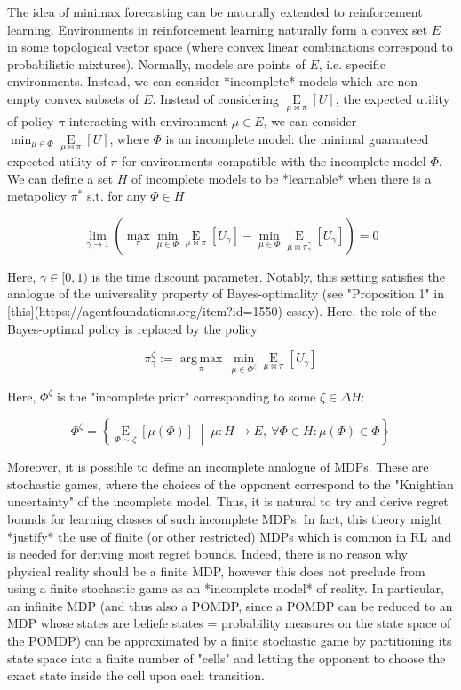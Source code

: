 \documentclass[a4paper]{article}
\newcommand{\AP}[1]{\left(#1\right)}
\newcommand{\AB}[1]{\left[#1\right]}
\newcommand{\ACM}[2]{\left\{#1\;\middle\vert\;#2\right\}}
\newcommand{\Ea}[2]{\underset{#1}{\operatorname{E}}\AB{#2}}
\newcommand{\Argmax}[1]{\underset{#1}{\operatorname{arg\,max}}\,}
\begin{document}
The idea of minimax forecasting can be naturally extended to reinforcement learning. Environments in reinforcement learning naturally form a convex set $E$ in some topological vector space (where convex linear combinations correspond to probabilistic mixtures). Normally, models are points of $E$, i.e. specific environments. Instead, we can consider *incomplete* models which are non-empty convex subsets of $E$. Instead of considering $\Ea{\mu\bowtie\pi}{U}$, the expected utility of policy $\pi$ interacting with environment $\mu \in E$, we can consider $\min_{\mu\in\Phi}{\Ea{\mu\bowtie\pi}{U}}$, where $\Phi$ is an incomplete model: the minimal guaranteed expected utility of $\pi$ for environments compatible with the incomplete model $\Phi$. We can define a set $H$ of incomplete models to be *learnable* when there is a metapolicy $\pi^*$ s.t. for any $\Phi \in H$

$$\lim_{\gamma \rightarrow 1} \AP{\max_{\pi} \min_{\mu\in\Phi}{\Ea{\mu\bowtie\pi}{U_\gamma}}-\min_{\mu\in\Phi}{\Ea{\mu\bowtie\pi_\gamma^*}{U_\gamma}}} = 0$$

Here, $\gamma\in[0,1)$ is the time discount parameter. Notably, this setting satisfies the analogue of the universality property of Bayes-optimality (see "Proposition 1" in [this](https://agentfoundations.org/item?id=1550) essay). Here, the role of the Bayes-optimal policy is replaced by the policy

$$\pi_\gamma^\zeta := \Argmax{\pi}{\min_{\mu\in\Phi^\zeta}{\Ea{\mu\bowtie\pi}{U_\gamma}}}$$

Here, $\Phi^\zeta$ is the "incomplete prior" corresponding to some $\zeta\in\Delta H$:

$$\Phi^\zeta = \ACM{\Ea{\Phi\sim\zeta}{\mu(\Phi)}}{\mu: H \rightarrow E,\ \forall\Phi \in H: \mu(\Phi) \in \Phi}$$

Moreover, it is possible to define an incomplete analogue of MDPs. These are stochastic games, where the choices of the opponent correspond to the "Knightian uncertainty" of the incomplete model. Thus, it is natural to try and derive regret bounds for learning classes of such incomplete MDPs. In fact, this theory might *justify* the use of finite (or other restricted) MDPs which is common in RL and is needed for deriving most regret bounds. Indeed, there is no reason why physical reality should be a finite MDP, however this does not preclude from using a finite stochastic game as an *incomplete model* of reality. In particular, an infinite MDP (and thus also a POMDP, since a POMDP can be reduced to an MDP whose states are beliefe states = probability measures on the state space of the POMDP) can be approximated by a finite stochastic game by partitioning its state space into a finite number of "cells" and letting the opponent to choose the exact state inside the cell upon each transition.
\end{document}

